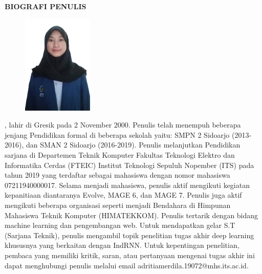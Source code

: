 \begin{center}
  \Large
  \textbf{BIOGRAFI PENULIS}
\end{center}


\vspace{2ex}

\begin{figure}
  \centering
  \vspace{-3ex}
  \includegraphics[width=0.3\textwidth]{gambar/formal.png}
  \vspace{-4ex}
\end{figure}

\name{}, lahir di Gresik pada 2 November 2000. Penulis telah menempuh beberapa jenjang Pendidikan formal di 
beberapa sekolah yaitu: SMPN 2 Sidoarjo (2013-2016), dan SMAN 2 Sidoarjo (2016-2019). Penulis melanjutkan 
Pendidikan sarjana di Departemen Teknik Komputer Fakultas Teknologi Elektro dan Informatika Cerdas (FTEIC) 
Institut Teknologi Sepuluh Nopember (ITS) pada tahun 2019 yang terdaftar sebagai mahasiswa dengan nomor 
mahasiswa 07211940000017. Selama menjadi mahasiswa, penulis aktif mengikuti kegiatan kepanitiaan diantaranya Evolve,
MAGE 6, dan MAGE 7. Penulis juga aktif mengikuti beberapa organisasi seperti menjadi Bendahara di 
Himpunan Mahasiswa Teknik Komputer (HIMATEKKOM). Penulis tertarik dengan bidang machine learning dan pengembangan web.
Untuk mendapatkan gelar S.T (Sarjana Teknik), penulis mengambil topik penelitian tugas akhir deep learning khususnya 
yang berkaitan dengan IndRNN. Untuk kepentingan penelitian, pembaca yang memiliki kritik, saran, atau pertanyaan 
mengenai tugas akhir ini dapat menghubungi penulis melalui email adritiamerdila.19072@mhs.its.ac.id.


